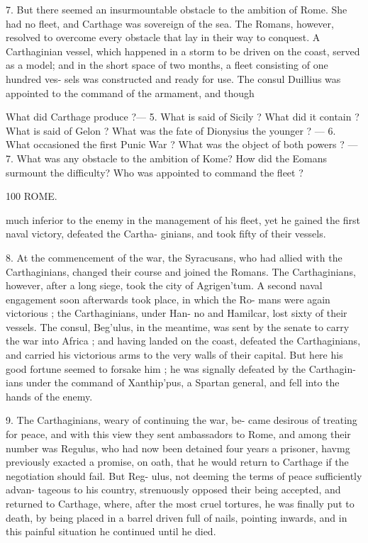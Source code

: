 \documentclass[openany,a4paper]{memoir}
\begin{document}
7. But there seemed an insurmountable obstacle to the 
ambition of Rome. She had no fleet, and Carthage was 
sovereign of the sea. The Romans, however, resolved to 
overcome every obstacle that lay in their way to conquest. 
A Carthaginian vessel, which happened in a storm to be 
driven on the coast, served as a model; and in the short 
space of two months, a fleet consisting of one hundred ves- 
sels was constructed and ready for use. The consul Duillius 
was appointed to the command of the armament, and though 

What did Carthage produce ?— 5. What is said of Sicily ? What did 
it contain ? What is said of Gelon ? What was the fate of Dionysius 
the younger ? — 6. What occasioned the first Punic War ? What was the 
object of both powers ? — 7. What was any obstacle to the ambition of 
Kome? How did the Eomans surmount the difficulty? Who was 
appointed to command the fleet ? 



100 ROME. 

much inferior to the enemy in the management of his fleet, 
yet he gained the first naval victory, defeated the Cartha- 
ginians, and took fifty of their vessels. 

8. At the commencement of the war, the Syracusans, who 
had allied with the Carthaginians, changed their course and 
joined the Romans. The Carthaginians, however, after a 
long siege, took the city of Agrigen'tum. A second naval 
engagement soon afterwards took place, in which the Ro- 
mans were again victorious ; the Carthaginians, under Han- 
no and Hamilcar, lost sixty of their vessels. The consul, 
Beg'ulus, in the meantime, was sent by the senate to carry 
the war into Africa ; and having landed on the coast, defeated 
the Carthaginians, and carried his victorious arms to the 
very walls of their capital. But here his good fortune seemed 
to forsake him ; he was signally defeated by the Carthagin- 
ians under the command of Xanthip'pus, a Spartan general, 
and fell into the hands of the enemy. 

9. The Carthaginians, weary of continuing the war, be- 
came desirous of treating for peace, and with this view they 
sent ambassadors to Rome, and among their number was 
Regulus, who had now been detained four years a prisoner, 
havmg previously exacted a promise, on oath, that he would 
return to Carthage if the negotiation should fail. But Reg- 
ulus, not deeming the terms of peace sufficiently advan- 
tageous to his country, strenuously opposed their being 
accepted, and returned to Carthage, where, after the most 
cruel tortures, he was finally put to death, by being placed in 
a barrel driven full of nails, pointing inwards, and in this 
painful situation he continued until he died. 
\end{document}
